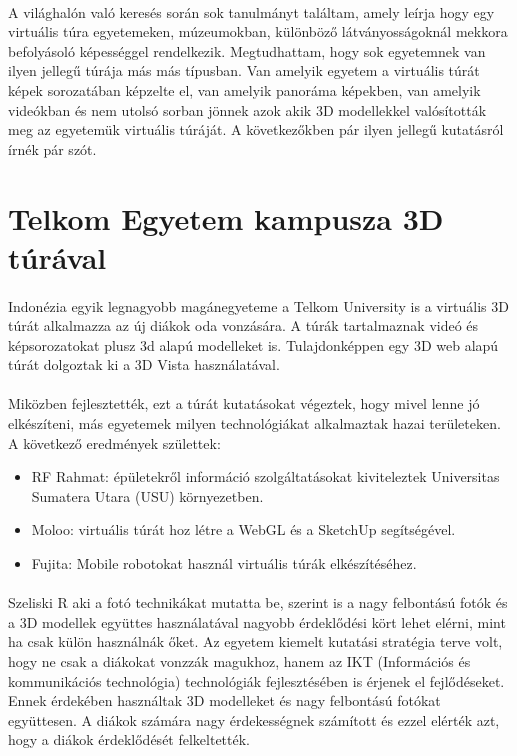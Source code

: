 \paragraph{}
A világhalón való keresés során sok tanulmányt találtam, amely leírja hogy egy virtuális túra egyetemeken, múzeumokban, különböző látványosságoknál mekkora befolyásoló képességgel rendelkezik. Megtudhattam, hogy sok egyetemnek van ilyen jellegű túrája más más típusban. Van amelyik egyetem a virtuális túrát képek sorozatában képzelte el, van amelyik panoráma képekben, van amelyik videókban és nem utolsó sorban jönnek azok akik 3D modellekkel valósították meg az egyetemük virtuális túráját. A következőkben pár ilyen jellegű kutatásról írnék pár szót.

\section{Telkom Egyetem kampusza 3D túrával}
\paragraph{}
Indonézia egyik legnagyobb magánegyeteme a Telkom University \cite{perdana2019implementation} is a virtuális 3D túrát alkalmazza az új diákok oda vonzására. A túrák tartalmaznak videó és képsorozatokat plusz 3d alapú modelleket is. Tulajdonképpen egy 3D web alapú túrát dolgoztak ki a 3D Vista használatával.
\paragraph{}
Miközben fejlesztették, ezt a túrát kutatásokat végeztek, hogy mivel lenne jó elkészíteni, más egyetemek milyen technológiákat alkalmaztak hazai területeken. A következő eredmények születtek: 
\begin{itemize}
	\item RF Rahmat: épületekről információ szolgáltatásokat kiviteleztek Universitas Sumatera Utara (USU) környezetben.
	\item Moloo: virtuális túrát hoz létre a WebGL és a SketchUp segítségével.
	\item Fujita: Mobile robotokat használ virtuális túrák elkészítéséhez.
	
\end{itemize}
\paragraph{}
Szeliski R aki a fotó technikákat mutatta be, szerint is a nagy felbontású fotók és a 3D modellek együttes használatával nagyobb érdeklődési kört lehet elérni, mint ha csak külön használnák őket. 
Az egyetem kiemelt kutatási stratégia terve volt, hogy ne csak a diákokat vonzzák magukhoz, hanem az IKT (Információs és kommunikációs technológia) technológiák fejlesztésében is érjenek el fejlődéseket. Ennek érdekében használtak 3D modelleket és nagy felbontású fotókat együttesen. A diákok számára nagy érdekességnek számított és ezzel elérték azt, hogy a diákok érdeklődését felkeltették.

